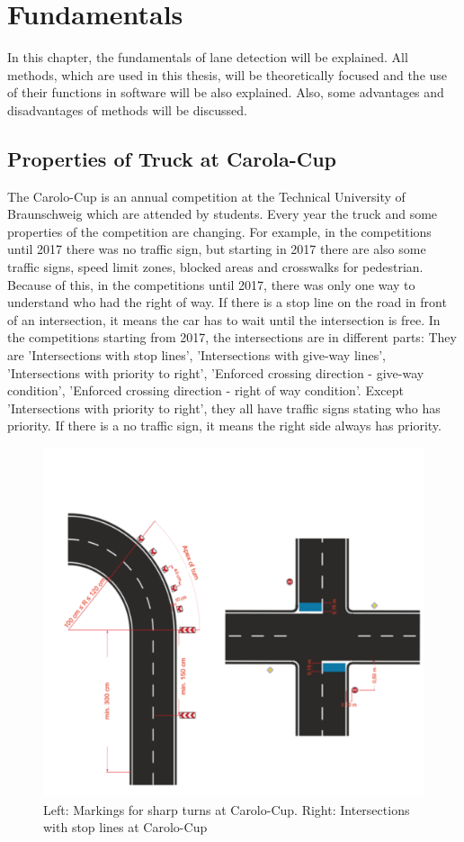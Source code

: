 %
\chapter{Fundamentals}\label{cha:Fundamentals}
%
In this chapter, the fundamentals of lane detection will be explained. All methods, which are used in this thesis, will be theoretically focused and the use of their functions in software will be also explained. Also, some advantages and disadvantages of methods will be discussed.
%
\section{Properties of Truck at Carola-Cup}\label{sec:Properties of Truck at Carolo-Cup}
%
The Carolo-Cup is an annual competition at the Technical University of Braunschweig which are attended by students. Every year the truck and some properties of the competition are changing. For example, in the competitions until 2017 there was no traffic sign, but starting in 2017 there are also some traffic signs, speed limit zones, blocked areas and crosswalks for pedestrian. Because of this, in the competitions until 2017, there was only one way to understand who had the right of way. If there is a stop line on the road in front of an intersection, it means the car has to wait until the intersection is free. In the competitions starting from 2017, the intersections are in different parts: They are 'Intersections with stop lines', 'Intersections with give-way lines', 'Intersections with priority to right', 'Enforced crossing direction - give-way condition', 'Enforced crossing direction - right of way condition'. Except 'Intersections with priority to right', they all have traffic signs stating who has priority. If there is a no traffic sign, it means the right side always has priority.\cite{Carolo_Cup}

\begin{figure}[H]
	\centering
	\hspace*{0cm}   
	\includegraphics[width=120mm,scale=1]{./Bilder/Intersections.png}
	\caption{Left: Markings for sharp turns at Carolo-Cup.
Right: Intersections with stop lines at Carolo-Cup\cite{Carolo_Cup}}
\end{figure}



